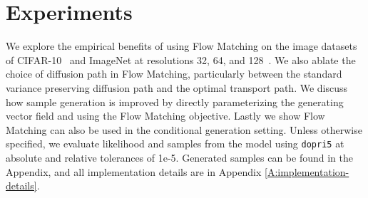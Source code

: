 \documentclass{article}
\def\eqref#1{equation~\ref{#1}}
\begin{document}
\section{Experiments}

We explore the empirical benefits of using Flow Matching on the image datasets of  CIFAR-10~\citep{krizhevsky2009learning} and ImageNet at resolutions 32, 64, and 128~\citep{chrabaszcz2017downsampled,deng2009-imagenet}. We also ablate the choice of diffusion path in Flow Matching, particularly between the standard variance preserving diffusion path and the optimal transport path. 
%
We discuss how sample generation is improved by directly parameterizing the generating vector field and using the Flow Matching objective. Lastly we show Flow Matching can also be used in the conditional generation setting. Unless otherwise specified, we evaluate likelihood and samples from the model using \texttt{dopri5} \citep{dormand1980family} at absolute and relative tolerances of 1e-5. Generated samples can be found in the Appendix, and all implementation details are in Appendix \ref{A:implementation-details}.\vspace{-5pt}

\end{document}

